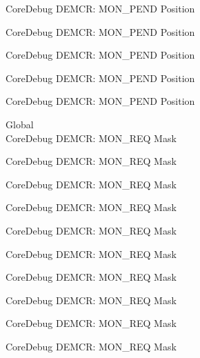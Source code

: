 \begin{DoxyRefList}
\label{deprecated__deprecated000873}%
%
Core\+Debug DEMCR\+: MON\+\_\+\+PEND Position 

\label{deprecated__deprecated001015}%
%
Core\+Debug DEMCR\+: MON\+\_\+\+PEND Position 

\label{deprecated__deprecated001091}%
%
Core\+Debug DEMCR\+: MON\+\_\+\+PEND Position 

\label{deprecated__deprecated001180}%
%
Core\+Debug DEMCR\+: MON\+\_\+\+PEND Position 

\label{deprecated__deprecated001282}%
%
Core\+Debug DEMCR\+: MON\+\_\+\+PEND Position  
\item[Global \doxylink{group___c_m_s_i_s___core_debug_gae6384cbe8045051186d13ef9cdeace95}{Core\+Debug\+\_\+\+DEMCR\+\_\+\+MON\+\_\+\+REQ\+\_\+\+Msk} ]\hfill \\
\label{deprecated__deprecated000048}%
%
Core\+Debug DEMCR\+: MON\+\_\+\+REQ Mask 

\label{deprecated__deprecated000192}%
%
Core\+Debug DEMCR\+: MON\+\_\+\+REQ Mask 

\label{deprecated__deprecated000334}%
%
Core\+Debug DEMCR\+: MON\+\_\+\+REQ Mask 

\label{deprecated__deprecated000410}%
%
Core\+Debug DEMCR\+: MON\+\_\+\+REQ Mask 

\label{deprecated__deprecated000499}%
%
Core\+Debug DEMCR\+: MON\+\_\+\+REQ Mask 

\label{deprecated__deprecated000601}%
%
Core\+Debug DEMCR\+: MON\+\_\+\+REQ Mask 

\label{deprecated__deprecated000726}%
%
Core\+Debug DEMCR\+: MON\+\_\+\+REQ Mask 

\label{deprecated__deprecated000870}%
%
Core\+Debug DEMCR\+: MON\+\_\+\+REQ Mask 

\label{deprecated__deprecated001012}%
%
Core\+Debug DEMCR\+: MON\+\_\+\+REQ Mask 

\label{deprecated__deprecated001088}%
%
Core\+Debug DEMCR\+: MON\+\_\+\+REQ Mask 


\end{DoxyRefList}
